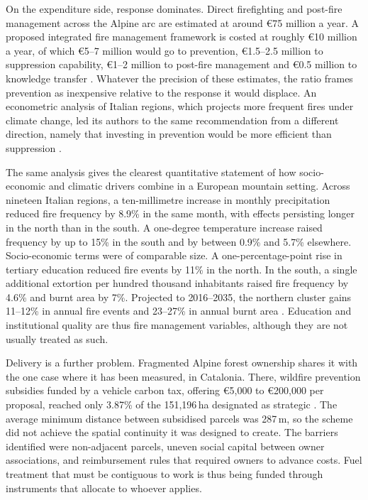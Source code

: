 \documentclass[11pt,a4paper]{article}
\begin{document}
On the expenditure side, response dominates. Direct firefighting and post-fire management across the Alpine arc are estimated at around €75 million a year. A proposed integrated fire management framework is costed at roughly €10 million a year, of which €5--7 million would go to prevention, €1.5--2.5 million to suppression capability, €1--2 million to post-fire management and €0.5 million to knowledge transfer \citep{muller_forest_2020}. Whatever the precision of these estimates, the ratio frames prevention as inexpensive relative to the response it would displace. An econometric analysis of Italian regions, which projects more frequent fires under climate change, led its authors to the same recommendation from a different direction, namely that investing in prevention would be more efficient than suppression \citep{michetti_forest_2019}.

The same analysis gives the clearest quantitative statement of how socio-economic and climatic drivers combine in a European mountain setting. Across nineteen Italian regions, a ten-millimetre increase in monthly precipitation reduced fire frequency by 8.9\% in the same month, with effects persisting longer in the north than in the south. A one-degree temperature increase raised frequency by up to 15\% in the south and by between 0.9\% and 5.7\% elsewhere. Socio-economic terms were of comparable size. A one-percentage-point rise in tertiary education reduced fire events by 11\% in the north. In the south, a single additional extortion per hundred thousand inhabitants raised fire frequency by 4.6\% and burnt area by 7\%. Projected to 2016--2035, the northern cluster gains 11--12\% in annual fire events and 23--27\% in annual burnt area \citep{michetti_forest_2019}. Education and institutional quality are thus fire management variables, although they are not usually treated as such.

Delivery is a further problem. Fragmented Alpine forest ownership shares it with the one case where it has been measured, in Catalonia. There, wildfire prevention subsidies funded by a vehicle carbon tax, offering €5{,}000 to €200{,}000 per proposal, reached only 3.87\% of the 151{,}196\,ha designated as strategic \citep{gorrizmifsud_current_2026}. The average minimum distance between subsidised parcels was 287\,m, so the scheme did not achieve the spatial continuity it was designed to create. The barriers identified were non-adjacent parcels, uneven social capital between owner associations, and reimbursement rules that required owners to advance costs. Fuel treatment that must be contiguous to work is thus being funded through instruments that allocate to whoever applies.
\end{document}
